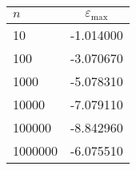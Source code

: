 \begin{tabular}{lc} \\
\hline
$n$ & $\varepsilon_{\text{max}}$ \\
\hline
10 & -1.014000\\
100 & -3.070670\\
1000 & -5.078310\\
10000 & -7.079110\\
100000 & -8.842960\\
1000000 & -6.075510\\
\hline
\end{tabular}